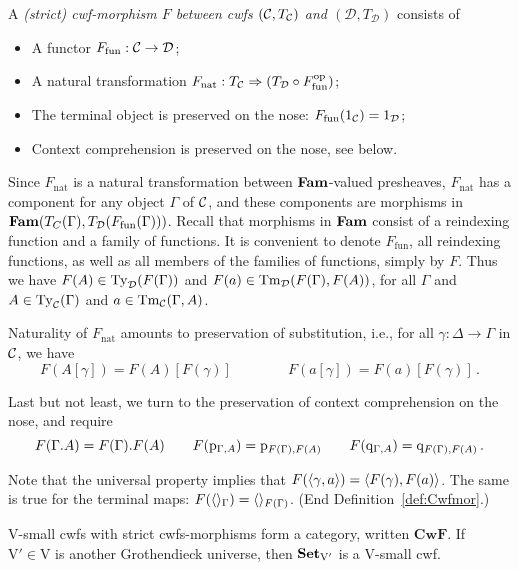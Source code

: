 \documentclass{mscs}
\def\D{\mathcal{D}}
\def\V{\mathrm{V}}
\def\Cwf{\mathbf{CwF}}
\def\nt{\mathrm{nat}}
\def\fun{\mathrm{fun}}
\begin{document}
\begin{definition}\label{def:Cwfmor}
A \emph{(strict) cwf-morphism $F$ between cwfs $({\mathcal C},T_{\mathcal C})$ and $(\D,T_\D)$}
consists of

\begin{itemize}

\item A functor $F_\fun : \C \to \D$;
\item A natural transformation $F_\nt : T_\C \Rightarrow (T_\D \circ F_\fun^\op)$;
\item The terminal object is preserved on the nose: $F_\fun(1_{\C}) = 1_{\D}$;
\item Context comprehension is preserved on the nose, see below.
\end{itemize}

Since $F_\nt$ is a natural transformation between $\textbf{Fam}$-valued presheaves,
$F_\nt$ has a component for any object $\Gamma$ of ${\mathcal C}$, and
these components are morphisms in $\Fam(T_C(\Gamma),T_\D(F_\fun(\Gamma)))$.
Recall that morphisms in $\textbf{Fam}$ consist of a reindexing function
and a family of functions. It is convenient to denote $F_\fun$,
all reindexing functions, as well as all members of the families of functions,
simply by $F$. Thus we have $F(A) \in \Ty_\D(F(\Gamma))$
and $F(a) \in \Tm_\D(F(\Gamma), F(A))$, for all $\Gamma$
and $A\in\mathrm{Ty}_{\mathcal C}(\Gamma)$ and $a\in \mathrm{Tm}_{\mathcal C}(\Gamma, A)$.

Naturality of $F_\nt$
amounts to preservation of substitution, {i.e.}, for all
$\gamma : \Delta \to \Gamma$ in ${\mathcal C}$, we have
\[
F(A[\gamma]) = F(A)[F(\gamma)] \qquad \qquad
F(a[\gamma]) = F(a)[F(\gamma)]\,.
\]

Last but not least, we turn to the preservation of context comprehension
on the nose, and require
\[
F(\Gamma. A) = F(\Gamma). F(A) \qquad
F(\mathrm{p}_{\Gamma, A}) = \mathrm{p}_{F(\Gamma), F(A)} \qquad
F(\mathrm{q}_{\Gamma, A}) = \mathrm{q}_{F(\Gamma), F(A)}\,.
\]

Note that the universal property implies that
$F(\langle \gamma,a \rangle) = \langle F(\gamma),F(a) \rangle$.
The same is true for the terminal maps:
$F(\langle  \rangle_\Gamma) = \langle  \rangle_{F(\Gamma)}$.
(End Definition~\ref{def:Cwfmor}.)
\end{definition}

$\V$-small cwfs with strict cwfs-morphisms form a category, written $\Cwf$.
If $\V' \in \V$ is another Grothendieck universe, then $\Set_{\V'}$ is a $\V$-small cwf.
\end{document}
